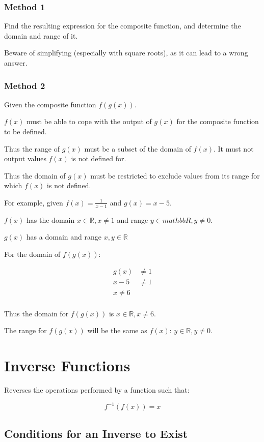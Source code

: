 \documentclass[a4paper,11pt]{report}
\begin{document}
\subsubsection{Method 1}

Find the resulting expression for the composite function, and determine the
domain and range of it.

Beware of simplifying (especially with square roots), as it can lead to a wrong
answer.

\subsubsection{Method 2}

Given the composite function $f(g(x))$.

$f(x)$ must be able to cope with the output of $g(x)$ for the composite
function to be defined.

Thus the range of $g(x)$ must be a subset of the domain of $f(x)$. It must not
output values $f(x)$ is not defined for.

Thus the domain of $g(x)$ must be restricted to exclude values from its range
for which $f(x)$ is not defined.

For example, given $f(x) = \frac{1}{x - 1}$ and $g(x) = x - 5$.

$f(x)$ has the domain $x \in \mathbb{R}, x \neq 1$ and range
$y \in mathbb{R}, y \neq 0$.

$g(x)$ has a domain and range $x, y \in \mathbb{R}$

For the domain of $f(g(x))$:

$$
\begin{aligned}
g(x) & \neq 1 \\
x - 5 & \neq 1 \\
x \neq 6 \\
\end{aligned}
$$

Thus the domain for $f(g(x))$ is $x \in \mathbb{R}, x \neq 6$.

The range for $f(g(x))$ will be the same as $f(x)$:
$y \in \mathbb{R}, y \neq 0$.


\section{Inverse Functions}

Reverses the operations performed by a function such that:

$$
f^{-1}(f(x)) = x
$$

\subsection{Conditions for an Inverse to Exist}
\end{document}
